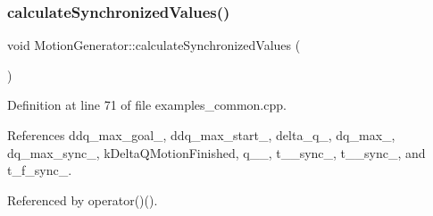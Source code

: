 \subsubsection{\texorpdfstring{calculate\+Synchronized\+Values()}{calculateSynchronizedValues()}}
{\footnotesize\ttfamily void Motion\+Generator\+::calculate\+Synchronized\+Values (\begin{DoxyParamCaption}{ }\end{DoxyParamCaption})\hspace{0.3cm}{\ttfamily [private]}}



Definition at line 71 of file examples\+\_\+common.\+cpp.



References ddq\+\_\+max\+\_\+goal\+\_\+, ddq\+\_\+max\+\_\+start\+\_\+, delta\+\_\+q\+\_\+, dq\+\_\+max\+\_\+, dq\+\_\+max\+\_\+sync\+\_\+, k\+Delta\+Q\+Motion\+Finished, q\+\_\+\_\+, t\+\_\+\_\+sync\+\_\+, t\+\_\+\_\+sync\+\_\+, and t\+\_\+f\+\_\+sync\+\_\+.



Referenced by operator()().



